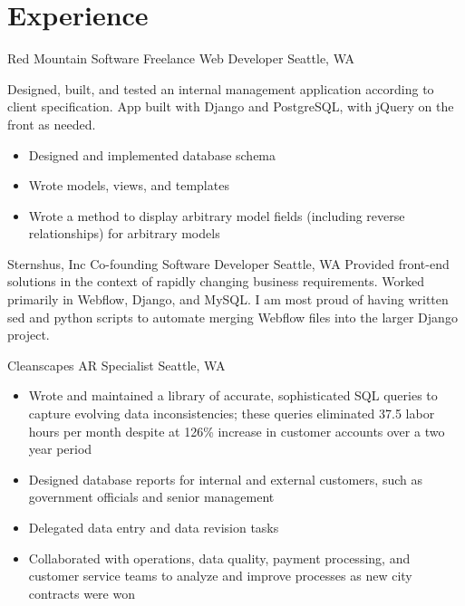 \documentclass[10pt,a4paper,sans]{moderncv}        %
\begin{document}
\section{Experience}

\begin{comment}
  \cventry
  {date - date}
  {Employer}
  {Job Title}
  {}
  {City, State}
  {Description of work
    \begin{itemize}
    \item specific achievement
    \item specific achievement
    \end{itemize}}
\end{comment}

 {Red Mountain Software} {Freelance Web Developer} {} {Seattle, WA} {Designed, built, and tested an internal management application according to client specification. App built with Django and PostgreSQL, with jQuery on the front as needed.
  \begin{itemize}
  \item Designed and implemented database schema
  \item Wrote models, views, and templates
  \item Wrote a method to display arbitrary model fields (including reverse relationships) for arbitrary models
  \end{itemize}}

 {Sternshus, Inc} {Co-founding Software Developer} {} {Seattle, WA} {Provided front-end solutions in the context of rapidly changing business requirements. Worked primarily in Webflow, Django, and MySQL. I am most proud of having written sed and python scripts to automate merging Webflow files into the larger Django project.}

 {Cleanscapes} {AR Specialist} {} {Seattle, WA} {
  \begin{itemize}
  \item Wrote and maintained a library of accurate, sophisticated SQL queries to capture evolving data inconsistencies; these queries eliminated 37.5 labor hours per month despite at 126\% increase in customer accounts over a two year period
  \item Designed database reports for internal and external customers, such as government officials and senior management
  \item Delegated data entry and data revision tasks
  \item Collaborated with operations, data quality, payment processing, and customer service teams to analyze and improve processes as new city contracts were won
  \end{itemize}}
\end{document}
